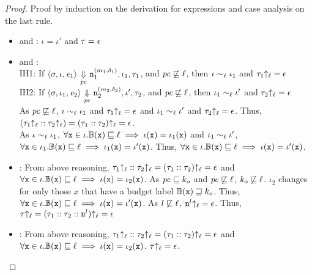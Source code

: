 \begin{proof}
  Proof by induction on the derivation for expressions and case analysis on
  the last rule. 
  \begin{itemize}[leftmargin=.5in]

  \item{} and : $\iota = \iota'$ and $\tau =  \epsilon$

  \item{} and : \\
    IH1: If $\langle \sigma, \iota, \mathit{e}_1 \rangle
    {~\underset{\mathit{pc}}{\Downarrow}~} \texttt{n}_1^{(m_1, \delta_1)}, \iota_1, \tau_1$,
    and $\mathit{pc} \not\sqsubseteq \ell$, then $\iota \sim_\ell \iota_1$
    and $\tau_1{\uparrow_\ell} = \epsilon$\\
    IH2: If $\langle \sigma, \iota_1, \mathit{e}_2 \rangle
    {~\underset{\mathit{pc}}{\Downarrow}~} \texttt{n}_2^{(m_2, \delta_2)}, \iota', \tau_2$,
    and $\mathit{pc} \not\sqsubseteq \ell$, then $\iota_1 \sim_\ell \iota'$
    and $\tau_2{\uparrow_\ell} = \epsilon$\\
    As $\mathit{pc} \not\sqsubseteq \ell$, $\iota \sim_\ell \iota_1$
    and $\tau_1{\uparrow_\ell} = \epsilon$ and $\iota_1 \sim_\ell \iota'$
    and $\tau_2{\uparrow_\ell} = \epsilon$. Thus,
    $(\tau_1{\uparrow_\ell}::\tau_2{\uparrow_\ell}) = (\tau_1::\tau_2){\uparrow_\ell} 
    =\epsilon$. \\
    As $\iota \sim_\ell \iota_1$, $\forall \texttt{x} \in \iota. \mathbb{B}(\texttt{x})
    \sqsubseteq \ell \implies \iota(\texttt{x}) = \iota_1(\texttt{x})$ and $\iota_1 
    \sim_\ell \iota'$, $\forall \texttt{x} \in \iota_1. \mathbb{B}(\texttt{x}) 
    \sqsubseteq \ell \implies \iota_1(\texttt{x}) = \iota'(\texttt{x})$. Thus, $\forall
    \texttt{x} \in \iota. \mathbb{B}(\texttt{x}) \sqsubseteq \ell \implies \iota(\texttt{x}) =
    \iota'(\texttt{x})$.

  \item{}: From above reasoning, $\tau_1{\uparrow_\ell}::\tau_2{\uparrow_\ell} =
    (\tau_1::\tau_2){\uparrow_\ell} = \epsilon$ and $\forall
    \texttt{x} \in \iota. \mathbb{B}(\texttt{x}) \sqsubseteq \ell \implies \iota(\texttt{x}) =
    \iota_2(\texttt{x})$. As $\mathit{pc} \sqsubseteq k_o$ and $\mathit{pc} \not\sqsubseteq
    \ell$, $k_o \not\sqsubseteq \ell$. $\iota_2$ changes for
    only those $x$ that have a budget label $\mathbb{B}(\texttt{x}) \sqsupseteq
    k_o$. Thus, $\forall \texttt{x} \in \iota. \mathbb{B}(\texttt{x}) \sqsubseteq \ell
    \implies \iota(\texttt{x}) = \iota'(\texttt{x})$. As $l \not\sqsubseteq \ell$,
    $\texttt{n}^l{\uparrow_\ell} = \epsilon$. Thus, $\tau{\uparrow_\ell} =
    (\tau_1::\tau_2::\texttt{n}^l){\uparrow_\ell} = \epsilon$

  \item{}: From above reasoning, $\tau_1{\uparrow_\ell}::\tau_2{\uparrow_\ell} =
    (\tau_1::\tau_2){\uparrow_\ell} = \epsilon$ and $\forall
    \texttt{x} \in \iota. \mathbb{B}(\texttt{x}) \sqsubseteq \ell \implies \iota(\texttt{x}) =
    \iota_2(\texttt{x})$. $\tau{\uparrow_\ell} = \epsilon$.
  \end{itemize}
\end{proof}

